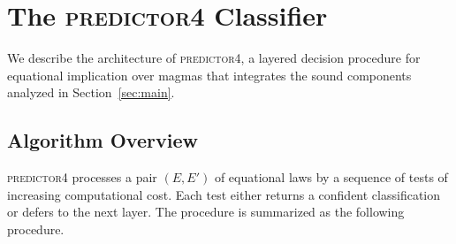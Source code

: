 \section{The \textsc{predictor4} Classifier}
\label{sec:classifier}

We describe the architecture of \textsc{predictor4}, a layered decision procedure
for equational implication over magmas that integrates the sound components analyzed
in Section~\ref{sec:main}.

\subsection{Algorithm Overview}

\textsc{predictor4} processes a pair $(E, E')$ of equational laws by a sequence of
tests of increasing computational cost.  Each test either returns a confident
classification or defers to the next layer.  The procedure is summarized as
the following procedure.

